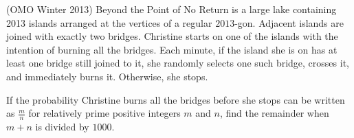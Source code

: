 \documentclass[11pt]{scrartcl}
\begin{document}
\begin{enumerate}[\bfseries {C}1.]
  \ii %
    (OMO Winter 2013) Beyond the Point of No Return is a large lake containing 2013 islands arranged at the vertices of a regular $2013$-gon.  Adjacent islands are joined with exactly two bridges.  Christine starts on one of the islands with the intention of burning all the bridges.  Each minute, if the island she is on has at least one bridge still joined to it, she randomly selects one such bridge, crosses it, and immediately burns it. Otherwise, she stops. \par If the probability Christine burns all the bridges before she stops can be written as $\frac{m}{n}$ for relatively prime positive integers $m$ and $n$, find the remainder when $m+n$ is divided by $1000$.
\end{enumerate}
\end{document}
